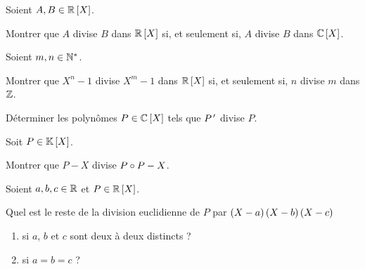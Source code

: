 \begin{corr}
\end{corr}

\begin{exo}[Exercice 9]
Soient \(A,B\in\poly[\R]\).

Montrer que \(A\) divise \(B\) dans \(\poly[\R]\) si, et seulement si, \(A\) divise \(B\) dans \(\poly[\C]\).
\end{exo}

\begin{corr}
\end{corr}

\begin{exo}[Exercice 10]
Soient \(m,n\in\mathbb{N}^*\).

Montrer que \(X^n-1\) divise \(X^m-1\) dans \(\poly[\R]\) si, et seulement si, \(n\) divise \(m\) dans \(\mathbb{Z}\).
\end{exo}

\begin{corr}
\end{corr}

\begin{exo}[Exercice 11]
Déterminer les polynômes \(P\in\poly[\C]\) tels que \(P^{\,\prime}\) divise \(P\).
\end{exo}

\begin{corr}
\end{corr}

\begin{exo}[Exercice 12]
Soit \(P\in\poly\).

Montrer que \(P-X\) divise \(P\circ P-X\).
\end{exo}

\begin{corr}
\end{corr}

\begin{exo}
Soient \(a,b,c\in\mathbb{R}\) et \(P\in\poly[\R]\).

Quel est le reste de la division euclidienne de \(P\) par \(\left(X-a\right)\left(X-b\right)\left(X-c\right)\)

\begin{enumerate}
\item si \(a\), \(b\) et \(c\) sont deux à deux distincts ? \\

\item si \(a=b=c\) ?
\end{enumerate}
\end{exo}

